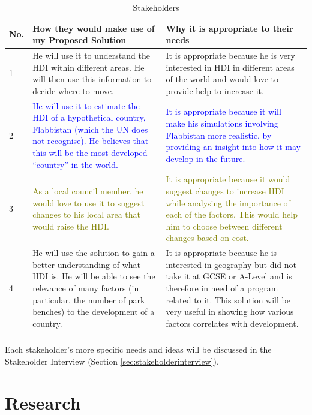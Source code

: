 \documentclass[12pt]{report}
\begin{document}
\begin{center}
\begin{longtable}{ | m{1cm} | m{7cm}| m{7cm} | } 
    \hline
    \textbf{No.} & \textbf{How they would make use of my Proposed Solution} & \textbf{Why it is appropriate to their needs} \\ 
    \hline
    1 & \textcolor{Sepia}{He will use it to understand the HDI within different areas. He will then use this information to decide where to move.} & \textcolor{Sepia}{It is appropriate because he is very interested in HDI in different areas of the world and would love to provide help to increase it.} \\ 
    \hline
    2 & \textcolor{Blue}{He will use it to estimate the HDI of a hypothetical country, Flabbistan (which the UN does not recognise). He believes that this will be the most developed ``country'' in the world.} & \textcolor{Blue}{It is appropriate because it will make his simulations involving Flabbistan more realistic, by providing an insight into how it may develop in the future.}\\ 
    \hline
    3 & \textcolor{olive}{As a local council member, he would love to use it to suggest changes to his local area that would raise the HDI.} & \textcolor{olive}{It is appropriate because it would suggest changes to increase HDI while analysing the importance of each of the factors. This would help him to choose between different changes based on cost.} \\
    \hline
    4 & \textcolor{OliveGreen}{He will use the solution to gain a better understanding of what HDI is. He will be able to see the relevance of many factors (in particular, the number of park benches) to the development of a country.} & \textcolor{OliveGreen}{It is appropriate because he is interested in geography but did not take it at GCSE or A-Level and is therefore in need of a program related to it. This solution will be very useful in showing how various factors correlates with development.} \\
    \hline
\caption{Stakeholders}\label{table:stakeholders}
\end{longtable}
\end{center}

Each stakeholder's more specific needs and ideas will be discussed in the Stakeholder Interview (Section \ref{sec:stakeholderinterview}).

\section{Research}
\end{document}
